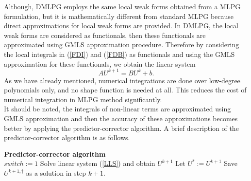 \documentclass[12pt]{article}
\numberwithin{equation}{section}
\begin{document}
Although, DMLPG employs the same local weak forms obtained from a MLPG
formulation, but it is mathematically different from standard MLPG because direct approximations for local weak forms are provided. In DMLPG, the local weak forms are considered as functionals, then these functionals are approximated using GMLS approximation procedure. Therefore by considering the local integrals in (\ref{FDI}) and (\ref{FDB}) as functionals and using the GMLS approximation for these functionals, we obtain the linear system
\begin{equation}\label{LLS}
A{U^{k + 1}} = B{U^k} + b.\end{equation}
As we have already mentioned, numerical integrations are done over low-degree polynomials only, and no shape function is needed at all. This reduces the cost of numerical integration in MLPG method significantly.\\
It should be noted, the integrals of non-linear terms are approximated using GMLS approximation and then the accuracy of these approximations becomes better by applying the predictor-corrector algorithm. A brief description of the predictor-corrector algorithm is as follows.
\begin{center}
\begin{algorithm}[H]
\SetAlgoLined

\textbf{Predictor-corrector algorithm}\\
 $switch:=1$\;
 Solve linear system (\ref{LLS}) and obtain ${U^{k + 1}}$
\;
 Let ${U^ * }:={U^{k+1}}$
\;
Save $
{U^{k + 1,\dag }}$ as a solution in step $k+1$.
\end{algorithm}
\end{center}
\end{document}
